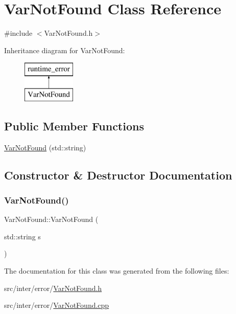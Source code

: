 \hypertarget{class_var_not_found}{}\section{Var\+Not\+Found Class Reference}
\label{class_var_not_found}


{\ttfamily \#include $<$Var\+Not\+Found.\+h$>$}

Inheritance diagram for Var\+Not\+Found\+:\begin{figure}[H]
\begin{center}
\leavevmode
\includegraphics[height=2.000000cm]{class_var_not_found}
\end{center}
\end{figure}
\subsection*{Public Member Functions}
\begin{DoxyCompactItemize}
\item 
\hyperlink{class_var_not_found_a36600e0d18a90f6a594cb582940b5bbc}{Var\+Not\+Found} (std\+::string)
\end{DoxyCompactItemize}


\subsection{Constructor \& Destructor Documentation}
\mbox{\label{class_var_not_found_a36600e0d18a90f6a594cb582940b5bbc}} 
\subsubsection{\texorpdfstring{Var\+Not\+Found()}{VarNotFound()}}
{\footnotesize\ttfamily Var\+Not\+Found\+::\+Var\+Not\+Found (\begin{DoxyParamCaption}\item[{std\+::string}]{s }\end{DoxyParamCaption})\hspace{0.3cm}{\ttfamily [explicit]}}



The documentation for this class was generated from the following files\+:\begin{DoxyCompactItemize}
\item 
src/inter/error/\hyperlink{_var_not_found_8h}{Var\+Not\+Found.\+h}\item 
src/inter/error/\hyperlink{_var_not_found_8cpp}{Var\+Not\+Found.\+cpp}\end{DoxyCompactItemize}
